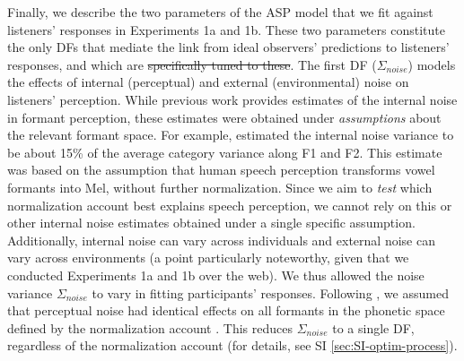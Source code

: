 \documentclass[preprint]{JASA}
\providecommand{\DIFadd}[1]{{\protect\color{blue}\uwave{#1}}} %
\providecommand{\DIFdel}[1]{{\protect\color{red}\sout{#1}}}                      %
\providecommand{\DIFaddbegin}{} %
\providecommand{\DIFaddend}{} %
\providecommand{\DIFdelbegin}{} %
\providecommand{\DIFdelend}{} %
\begin{document}
Finally, we describe the two parameters of the ASP model that we fit against listeners' responses in Experiments 1a and 1b. These two parameters constitute the only DFs that mediate the link from ideal observers' predictions to listeners' responses, and which are \DIFdelbegin \DIFdel{specifically tuned to these}\DIFdelend \DIFaddbegin \DIFadd{fit to listeners' responses}\DIFaddend . The first DF (\(\Sigma_{noise}\)) models the effects of internal (perceptual) and external (environmental) noise on listeners' perception. While previous work provides estimates of the internal noise in formant perception, these estimates were obtained under \emph{assumptions} about the relevant formant space. For example, \citet{feldman2009} estimated the internal noise variance to be about 15\% of the average category variance along F1 and F2. This estimate was based on the assumption that human speech perception transforms vowel formants into Mel, without further normalization. Since we aim to \emph{test} which normalization account best explains speech perception, we cannot rely on this or other internal noise estimates obtained under a single specific assumption. Additionally, internal noise can vary across individuals and external noise can vary across environments (a point particularly noteworthy, given that we conducted Experiments 1a and 1b over the web). We thus allowed the noise variance \(\Sigma_{noise}\) to vary in fitting participants' responses. Following \citet{feldman2009}, we assumed that perceptual noise had identical effects on all formants in the phonetic space defined by the normalization account \citep[see also][]{kronrod2016}. This reduces \(\Sigma_{noise}\) to a single DF, regardless of the normalization account (for details, see SI \ref{sec:SI-optim-process}).
\end{document}
